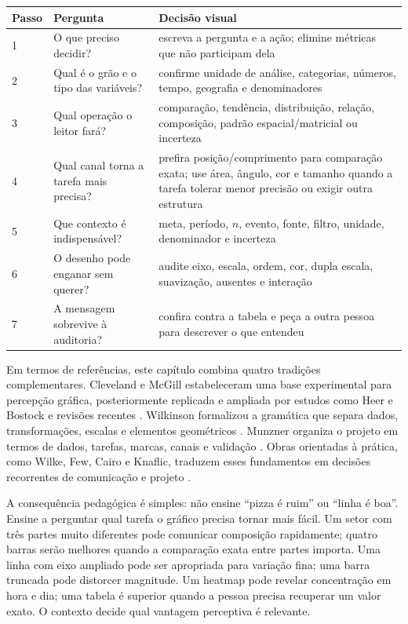 \begin{center}
\small
\begin{tabularx}{0.96\textwidth}{p{1.15cm} p{3.15cm} X}
\toprule
\textbf{Passo} & \textbf{Pergunta} & \textbf{Decisão visual} \\
\midrule
1 & O que preciso decidir? & escreva a pergunta e a ação; elimine métricas que não participam dela \\
2 & Qual é o grão e o tipo das variáveis? & confirme unidade de análise, categorias, números, tempo, geografia e denominadores \\
3 & Qual operação o leitor fará? & comparação, tendência, distribuição, relação, composição, padrão espacial/matricial ou incerteza \\
4 & Qual canal torna a tarefa mais precisa? & prefira posição/comprimento para comparação exata; use área, ângulo, cor e tamanho quando a tarefa tolerar menor precisão ou exigir outra estrutura \\
5 & Que contexto é indispensável? & meta, período, $n$, evento, fonte, filtro, unidade, denominador e incerteza \\
6 & O desenho pode enganar sem querer? & audite eixo, escala, ordem, cor, dupla escala, suavização, ausentes e interação \\
7 & A mensagem sobrevive à auditoria? & confira contra a tabela e peça a outra pessoa para descrever o que entendeu \\
\bottomrule
\end{tabularx}
\end{center}

Em termos de referências, este capítulo combina quatro tradições complementares. Cleveland e McGill estabeleceram uma base experimental para percepção gráfica, posteriormente replicada e ampliada por estudos como Heer e Bostock e revisões recentes \cite{cleveland1984,heer2010,zeng2023}. Wilkinson formalizou a gramática que separa dados, transformações, escalas e elementos geométricos \cite{wilkinson2005}. Munzner organiza o projeto em termos de dados, tarefas, marcas, canais e validação \cite{munzner2014}. Obras orientadas à prática, como Wilke, Few, Cairo e Knaflic, traduzem esses fundamentos em decisões recorrentes de comunicação e projeto \cite{wilke2019,few2012,cairo2016,knaflic2015}.

A consequência pedagógica é simples: não ensine ``pizza é ruim'' ou ``linha é boa''. Ensine a perguntar qual tarefa o gráfico precisa tornar mais fácil. Um setor com três partes muito diferentes pode comunicar composição rapidamente; quatro barras serão melhores quando a comparação exata entre partes importa. Uma linha com eixo ampliado pode ser apropriada para variação fina; uma barra truncada pode distorcer magnitude. Um heatmap pode revelar concentração em hora e dia; uma tabela é superior quando a pessoa precisa recuperar um valor exato. O contexto decide qual vantagem perceptiva é relevante.

